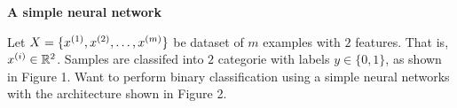 \documentclass[12pt,letterpaper,boxed]{hmcpset}
\begin{document}

\begin{problem}[Problem 1]
  \textbf{A simple neural network}
  
  Let $X = \{ \xx[1], \xx[2], \dots, \xx[m] \}$ be dataset of $m$ examples with $2$ features. That is, $\xx \in \R^2$. Samples are classifed into $2$ categorie with labels $y \in \{0, 1\}$, as shown in Figure 1. Want to perform binary classification using a simple neural networks with the architecture shown in Figure 2.
\end{problem}
\end{document}
